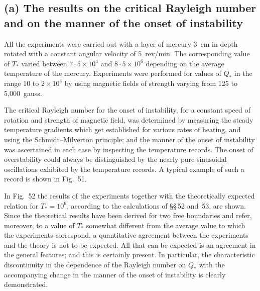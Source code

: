 
\subsection*{(a) The results on the critical Rayleigh number and on the manner of
the onset of instability}

All the experiments were carried out with a layer of mercury 3~cm in
depth rotated with a constant angular velocity of 5~rev/min. The corresponding value of $T_*$ varied between $7{\cdot}5\times 10^4$ and $8{\cdot}5\times 10^6$ depending on
the average temperature of the mercury. Experiments were performed
for values of $Q_*$ in the range 10 to $2\times 10^4$ by using magnetic fields of
strength varying from 125 to 5{,}000~gauss.

The critical Rayleigh number for the onset of instability, for a constant
speed of rotation and strength of magnetic field, was determined by
measuring the steady temperature gradients which get established for
various rates of heating, and using the Schmidt--Milverton principle;
and the manner of the onset of instability was ascertained in each case
by inspecting the temperature records. The onset of overstability could
always be distinguished by the nearly pure sinusoidal oscillations
exhibited by the temperature records. A typical example of such a
record is shown in Fig.~51.


In Fig.~52 the results of the experiments together with the theoretically
expected relation for $T_* = 10^6$, according to the calculations of \S\S\,52
and~53, are shown. Since the theoretical results have been derived for two
free boundaries and refer, moreover, to a value of $T_*$ somewhat different
from the average value to which the experiments correspond, a quantitative agreement between the experiments and the theory is not to be
expected. All that can be expected is an agreement in the general
features; and this is certainly present. In particular, the characteristic
discontinuity in the dependence of the Rayleigh number on $Q_*$ with the
accompanying change in the manner of the onset of instability is clearly
demonstrated.

